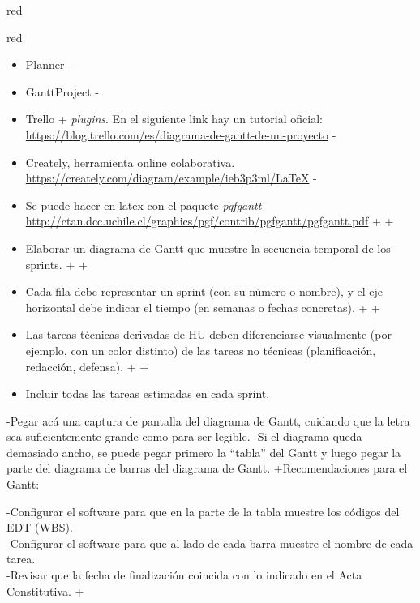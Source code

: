 \documentclass[
 11pt, %
-%
+codirector, %
 ]{charter}
\begin{document}
\begin{table}[ht]
\begin{table}[ht]
\begin{consigna}{red}
\begin{consigna}{red}
 \begin{itemize}
-\item Planner
-\item GanttProject
-\item Trello + \textit{plugins}. En el siguiente link hay un tutorial oficial: \\ \url{https://blog.trello.com/es/diagrama-de-gantt-de-un-proyecto}
-\item Creately, herramienta online colaborativa. \\\url{https://creately.com/diagram/example/ieb3p3ml/LaTeX}
-\item Se puede hacer en latex con el paquete \textit{pgfgantt}\\ \url{http://ctan.dcc.uchile.cl/graphics/pgf/contrib/pgfgantt/pgfgantt.pdf}
+
+\item Elaborar un diagrama de Gantt que muestre la secuencia temporal de los sprints.
+
+\item Cada fila debe representar un sprint (con su número o nombre), y el eje horizontal debe indicar el tiempo (en semanas o fechas concretas).
+
+\item Las tareas técnicas derivadas de HU deben diferenciarse visualmente (por ejemplo, con un color distinto) de las tareas no técnicas (planificación, redacción, defensa).
+
+\item Incluir todas las tareas estimadas en cada sprint.
 \end{itemize}
 
-Pegar acá una captura de pantalla del diagrama de Gantt, cuidando que la letra sea suficientemente grande como para ser legible. 
-Si el diagrama queda demasiado ancho, se puede pegar primero la ``tabla'' del Gantt y luego pegar la parte del diagrama de barras del diagrama de Gantt.
+Recomendaciones para el Gantt:
 
-Configurar el software para que en la parte de la tabla muestre los códigos del EDT (WBS).\\
-Configurar el software para que al lado de cada barra muestre el nombre de cada tarea.\\
-Revisar que la fecha de finalización coincida con lo indicado en el Acta Constitutiva.
+\begin{itemize}
 

\end{itemize}
\end{consigna}
\end{consigna}
\end{table}
\end{table}
\end{document}
